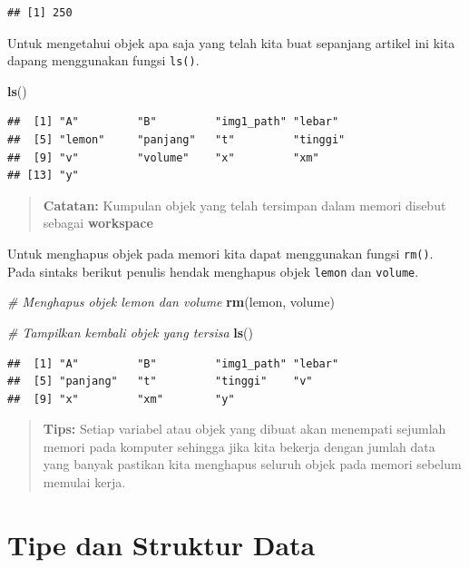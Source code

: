 \documentclass[]{book}
\newenvironment{Shaded}{\begin{snugshade}}{\end{snugshade}}
\newcommand{\CommentTok}[1]{\textcolor[rgb]{0.56,0.35,0.01}{\textit{#1}}}
\newcommand{\KeywordTok}[1]{\textcolor[rgb]{0.13,0.29,0.53}{\textbf{#1}}}
\newcommand{\NormalTok}[1]{#1}
\theoremstyle{definition}
\theoremstyle{definition}
\theoremstyle{definition}
\theoremstyle{remark}
\begin{document}
\begin{verbatim}
## [1] 250
\end{verbatim}

Untuk mengetahui objek apa saja yang telah kita buat sepanjang artikel ini kita dapang menggunakan fungsi \texttt{ls()}.

\begin{Shaded}
\begin{Highlighting}[]
\KeywordTok{ls}\NormalTok{()}
\end{Highlighting}
\end{Shaded}

\begin{verbatim}
##  [1] "A"         "B"         "img1_path" "lebar"    
##  [5] "lemon"     "panjang"   "t"         "tinggi"   
##  [9] "v"         "volume"    "x"         "xm"       
## [13] "y"
\end{verbatim}

\begin{quote}
\textbf{Catatan:} Kumpulan objek yang telah tersimpan dalam memori disebut sebagai \textbf{workspace}
\end{quote}

Untuk menghapus objek pada memori kita dapat menggunakan fungsi \texttt{rm()}. Pada sintaks berikut penulis hendak menghapus objek \texttt{lemon} dan \texttt{volume}.

\begin{Shaded}
\begin{Highlighting}[]
\CommentTok{# Menghapus objek lemon dan volume}
\KeywordTok{rm}\NormalTok{(lemon, volume)}

\CommentTok{# Tampilkan kembali objek yang tersisa}
\KeywordTok{ls}\NormalTok{()}
\end{Highlighting}
\end{Shaded}

\begin{verbatim}
##  [1] "A"         "B"         "img1_path" "lebar"    
##  [5] "panjang"   "t"         "tinggi"    "v"        
##  [9] "x"         "xm"        "y"
\end{verbatim}

\begin{quote}
\textbf{Tips:} Setiap variabel atau objek yang dibuat akan menempati sejumlah memori pada komputer sehingga jika kita bekerja dengan jumlah data yang banyak pastikan kita menghapus seluruh objek pada memori sebelum memulai kerja.
\end{quote}

\hypertarget{typedata}{%
\section{Tipe dan Struktur Data}\label{typedata}}
\end{document}

